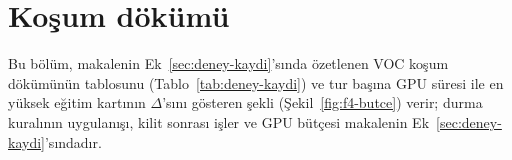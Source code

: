 \setcounter{table}{0}\setcounter{figure}{0}
\section{Koşum dökümü}\label{sec:ek-dokum}

Bu bölüm, makalenin Ek~\ref{sec:deney-kaydi}'sında özetlenen VOC koşum dökümünün tablosunu (Tablo~\ref{tab:deney-kaydi}) ve tur başına GPU süresi ile en yüksek eğitim kartının $\Delta$'sını gösteren şekli (Şekil~\ref{fig:f4-butce}) verir; durma kuralının uygulanışı, kilit sonrası işler ve GPU bütçesi makalenin Ek~\ref{sec:deney-kaydi}'sındadır.





\FloatBarrier
